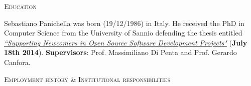 \documentclass[11pt]{article}
\begin{document}
\vspace{2.5mm}
\textsc{Education}
\vspace{1.5mm}

Sebastiano Panichella was born (19/12/1986) in Italy.
He received the PhD in Computer Science from the University of Sannio 
 defending the thesis entitled  \href{http://dx.doi.org/10.1109/ICSM.2015.7332519}{\textit{``Supporting Newcomers in Open Source Software Development Projects"}} (\textbf{July 18th 2014}). \textbf{Supervisors}: Prof. Massimiliano  Di Penta and Prof. Gerardo Canfora.

\vspace{2.5mm}
\textsc{Employment history \& Institutional responsibilities}
\vspace{1.5mm}

\end{document}
